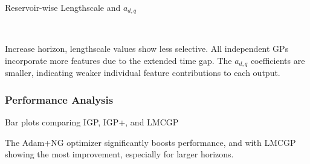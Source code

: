 \begin{frame}{Reservoir-wise Lengthscale and $a_{d, q}$}
\begin{figure}[htbp]
	\tiny
	\centering
	\setlength{} 
	\setlength{}
	\vspace{-1.5em}
	\\ %
\end{figure}


	\vspace{-1.0em}
	\begin{block}{}
		Increase horizon, lengthscale values show less selective. All independent GPs incorporate more features due to the extended time gap. The $a_{d,q}$ coefficients are smaller, indicating weaker individual feature contributions to each output.
	\end{block}
	
	
\end{frame}


\subsubsection{Performance Analysis}

\begin{frame}{Bar plots comparing IGP, IGP+, and LMCGP}
	\begin{figure}[htbp]
		\centering
		\setlength{}
		\setlength{}
		
		\subfloat[MSLL]{}
		\hfill
		\subfloat[NLPD]{}
		
	\end{figure}
	\vspace{-2.0em}
	\begin{block}{}
		The Adam+NG optimizer significantly boosts performance, and with LMCGP showing the most improvement, especially for larger horizons.
	\end{block}
	
	
\end{frame}

